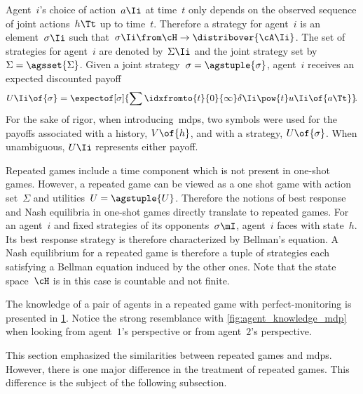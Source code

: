 Agent~\(i\)'s choice of action~\(a\Ii\) at time~\(t\) only depends on the observed sequence of joint actions~\(h\Tt\) up to time~\(t\).
Therefore a strategy for agent~\(i\) is an element~\(\sigma\Ii\) such that~\(\sigma\Ii \from \cH \to \distribover{\cA\Ii}\).
The set of strategies for agent~\(i\) are denoted by~\(\Sigma\Ii\) and the joint strategy set by~\(\Sigma  = \agsset{\Sigma}\).
Given a joint strategy~\(\sigma = \agstuple{\sigma}\), agent~\(i\) receives an expected discounted payoff
\[
U\Ii \of{\sigma} = \expectof[\sigma]{ \sum\idxfromto{t}{0}{\infty} \delta\Ii\pow{t} u\Ii \of{a\Tt}}\!.
\]
For the sake of rigor, when introducing~\acp{mdp}, two symbols were used for the payoffs associated with a history, \(V \of{h}\), and with a strategy, \(U \of{\sigma}\).
When unambiguous, \(U\Ii\) represents either payoff.

Repeated games include a time component which is not present in one-shot games.
However, a repeated game can be viewed as a one shot game with action set~\(\Sigma\) and utilities~\(U = \agstuple{U}\).
Therefore the notions of best response and Nash equilibria in one-shot games directly translate to repeated games.
For an agent~\(i\) and fixed strategies of its opponents~\(\sigma\mI\), agent~\(i\) faces  with state~\(h\).
Its best response strategy is therefore characterized by Bellman's equation.
A Nash equilibrium for a repeated game is therefore a tuple of strategies each satisfying a Bellman equation induced by the other ones.
Note that the state space~\(\cH\) is in this case is countable and not finite.

The knowledge of a pair of agents in a repeated game with perfect-monitoring is presented in \cref{fig:agent_knowledge_perfect-monitoring_repeated_game}.
Notice the strong resemblance with \cref{fig:agent_knowledge_mdp} when looking from agent~\(1\)'s perspective or from agent~\(2\)'s perspective.

\begin{figure}[htp]
\centering
{}
\label{fig:agent_knowledge_perfect-monitoring_repeated_game}
\end{figure}

This section emphasized the similarities between repeated games and \acp{mdp}.
However, there is one major difference in the treatment of repeated games.
This difference is the subject of the following subsection.

